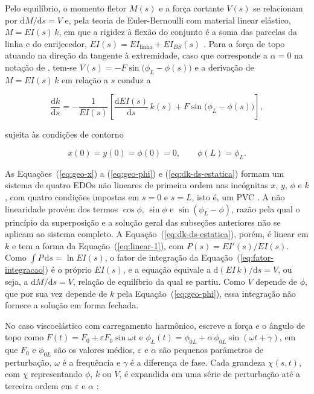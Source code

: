 \documentclass[arial,centeredequations,english,brazilian,oneside,section=TITLE]{ifes8}
\begin{document}
Pelo equilíbrio, o momento fletor $M(s)$ e a força cortante $V(s)$ se relacionam por
$\mathrm{d}M/\mathrm{d}s = V$ \cite{Caire2011} e, pela teoria de Euler-Bernoulli
com material linear elástico, $M = EI(s)\,k$, em que a rigidez à flexão do conjunto é a
soma das parcelas da linha e do enrijecedor, $EI(s) = EI_{\mathrm{linha}} +
EI_{BS}(s)$ \cite{Caire2005}. Para a força de topo atuando na direção da tangente
à extremidade, caso que corresponde a $\alpha = 0$ na notação de ,
tem-se $V(s) = -F\sin\!\big(\phi_L - \phi(s)\big)$ e a derivação de $M = EI(s)\,k$ em
relação a $s$ conduz a \cite{Caire2005}

\begin{equation}
  \label{eq:dk-ds-estatica}
  \frac{\mathrm{d}k}{\mathrm{d}s}
  = -\frac{1}{EI(s)}\left[\frac{\mathrm{d}EI(s)}{\mathrm{d}s}\,k(s)
  + F\sin\!\big(\phi_L - \phi(s)\big)\right],
\end{equation}

sujeita às condições de contorno \cite{Caire2005}

\begin{equation}
  \label{eq:cc-estatica}
  x(0) = y(0) = \phi(0) = 0, \qquad \phi(L) = \phi_L.
\end{equation}

As Equações~(\ref{eq:geo-x}) a (\ref{eq:geo-phi}) e (\ref{eq:dk-ds-estatica}) formam um
sistema de quatro EDOs não lineares de primeira ordem nas incógnitas $x$, $y$, $\phi$ e
$k$, com quatro condições impostas em $s = 0$ e $s = L$, isto é, um PVC
\cite{Caire2005}. A não linearidade provém dos termos $\cos\phi$, $\sin\phi$ e
$\sin(\phi_L - \phi)$, razão pela qual o princípio da superposição e a solução geral
das subseções anteriores não se aplicam ao sistema completo. A
Equação~(\ref{eq:dk-ds-estatica}), porém, é linear em $k$ e tem a forma da
Equação~(\ref{eq:linear-1}), com $P(s) = EI'(s)/EI(s)$. Como $\int P\,\mathrm{d}s =
\ln EI(s)$, o fator de integração da Equação~(\ref{eq:fator-integracao}) é o próprio
$EI(s)$, e a equação equivale a $\mathrm{d}(EI\,k)/\mathrm{d}s = V$, ou seja, a
$\mathrm{d}M/\mathrm{d}s = V$, relação de equilíbrio da qual se partiu. Como $V$ depende
de $\phi$, que por sua vez depende de $k$ pela Equação~(\ref{eq:geo-phi}), essa
integração não fornece a solução em forma fechada.
 
No caso viscoelástico com carregamento harmônico, 
escreve a força e o ângulo de topo como $F(t) = F_0 + \varepsilon F_0 \sin\omega t$ e
$\phi_L(t) = \phi_{0L} + \alpha\,\phi_{0L}\sin(\omega t + \gamma)$, em que $F_0$ e
$\phi_{0L}$ são os valores médios, $\varepsilon$ e $\alpha$ são pequenos parâmetros de
perturbação, $\omega$ é a frequência e $\gamma$ é a diferença de fase. Cada grandeza
$\chi(s,t)$, com $\chi$ representando $\phi$, $k$ ou $V$, é expandida em uma série de
perturbação até a terceira ordem em $\varepsilon$ e $\alpha$ \cite{Caire2011}:
\end{document}
